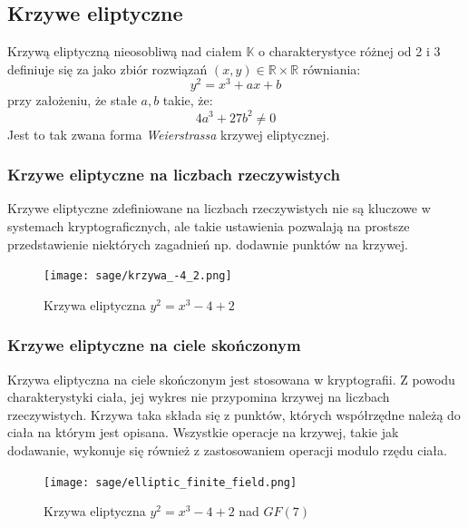 \subsection{Krzywe eliptyczne}
Krzywą eliptyczną nieosobliwą nad ciałem $\mathbb{K}$ o charakterystyce różnej od 2 i 3 definiuje się
za jako zbiór rozwiązań $(x,y) \in \mathbb{R} \times \mathbb{R}$ równiania: \cite*{stinson21}
\[y^2 = x^3 + ax + b\]
przy założeniu, że stałe $a, b$ takie, że:
\[4a^3 + 27b^2 \not= 0\]
Jest to tak zwana forma {\it Weierstrassa} krzywej eliptycznej.

\subsubsection{Krzywe eliptyczne na liczbach rzeczywistych}

Krzywe eliptyczne zdefiniowane na liczbach rzeczywistych nie są kluczowe w
systemach kryptograficznych\cite*{chrzaszczyk2010}\cite*{stinson21}, ale takie ustawienia
pozwalają na prostsze przedstawienie niektórych zagadnień
np. dodawnie punktów na krzywej.
\begin{figure}[!h]
    \centering \texttt{[image: sage/krzywa\_-4\_2.png]}
    \caption{Krzywa eliptyczna $y^2=x^3-4+2$}
\end{figure}

\subsubsection*{Krzywe eliptyczne na ciele skończonym}
Krzywa eliptyczna na ciele skończonym jest stosowana w kryptografii.
Z powodu charakterystyki ciała, jej wykres
nie przypomina krzywej na liczbach rzeczywistych.
Krzywa taka składa się z punktów, których współrzędne należą do ciała
na którym jest opisana.
Wszystkie operacje na krzywej, takie jak dodawanie, wykonuje się
również z zastosowaniem operacji modulo rzędu ciała.
\begin{figure}[!h]
    \centering \texttt{[image: sage/elliptic\_finite\_field.png]}
    \caption{Krzywa eliptyczna $y^2=x^3-4+2$ nad $GF(7)$}
\end{figure}

